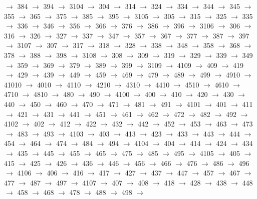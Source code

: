 $\rightarrow$ 384 $\rightarrow$ 394 $\rightarrow$ 3104 $\rightarrow$ 304 $\rightarrow$ 314 $\rightarrow$ 324 $\rightarrow$ 334 $\rightarrow$ 344 $\rightarrow$ 345 $\rightarrow$ 355 $\rightarrow$ 365 $\rightarrow$ 375 $\rightarrow$ 385 $\rightarrow$ 395 $\rightarrow$ 3105 $\rightarrow$ 305 $\rightarrow$ 315 $\rightarrow$ 325 $\rightarrow$ 335 $\rightarrow$ 336 $\rightarrow$ 346 $\rightarrow$ 356 $\rightarrow$ 366 $\rightarrow$ 376 $\rightarrow$ 386 $\rightarrow$ 396 $\rightarrow$ 3106 $\rightarrow$ 306 $\rightarrow$ 316 $\rightarrow$ 326 $\rightarrow$ 327 $\rightarrow$ 337 $\rightarrow$ 347 $\rightarrow$ 357 $\rightarrow$ 367 $\rightarrow$ 377 $\rightarrow$ 387 $\rightarrow$ 397 $\rightarrow$ 3107 $\rightarrow$ 307 $\rightarrow$ 317 $\rightarrow$ 318 $\rightarrow$ 328 $\rightarrow$ 338 $\rightarrow$ 348 $\rightarrow$ 358 $\rightarrow$ 368 $\rightarrow$ 378 $\rightarrow$ 388 $\rightarrow$ 398 $\rightarrow$ 3108 $\rightarrow$ 308 $\rightarrow$ 309 $\rightarrow$ 319 $\rightarrow$ 329 $\rightarrow$ 339 $\rightarrow$ 349 $\rightarrow$ 359 $\rightarrow$ 369 $\rightarrow$ 379 $\rightarrow$ 389 $\rightarrow$ 399 $\rightarrow$ 3109 $\rightarrow$ 4109 $\rightarrow$ 409 $\rightarrow$ 419 $\rightarrow$ 429 $\rightarrow$ 439 $\rightarrow$ 449 $\rightarrow$ 459 $\rightarrow$ 469 $\rightarrow$ 479 $\rightarrow$ 489 $\rightarrow$ 499 $\rightarrow$ 4910 $\rightarrow$ 41010 $\rightarrow$ 4010 $\rightarrow$ 4110 $\rightarrow$ 4210 $\rightarrow$ 4310 $\rightarrow$ 4410 $\rightarrow$ 4510 $\rightarrow$ 4610 $\rightarrow$ 4710 $\rightarrow$ 4810 $\rightarrow$ 480 $\rightarrow$ 490 $\rightarrow$ 4100 $\rightarrow$ 400 $\rightarrow$ 410 $\rightarrow$ 420 $\rightarrow$ 430 $\rightarrow$ 440 $\rightarrow$ 450 $\rightarrow$ 460 $\rightarrow$ 470 $\rightarrow$ 471 $\rightarrow$ 481 $\rightarrow$ 491 $\rightarrow$ 4101 $\rightarrow$ 401 $\rightarrow$ 411 $\rightarrow$ 421 $\rightarrow$ 431 $\rightarrow$ 441 $\rightarrow$ 451 $\rightarrow$ 461 $\rightarrow$ 462 $\rightarrow$ 472 $\rightarrow$ 482 $\rightarrow$ 492 $\rightarrow$ 4102 $\rightarrow$ 402 $\rightarrow$ 412 $\rightarrow$ 422 $\rightarrow$ 432 $\rightarrow$ 442 $\rightarrow$ 452 $\rightarrow$ 453 $\rightarrow$ 463 $\rightarrow$ 473 $\rightarrow$ 483 $\rightarrow$ 493 $\rightarrow$ 4103 $\rightarrow$ 403 $\rightarrow$ 413 $\rightarrow$ 423 $\rightarrow$ 433 $\rightarrow$ 443 $\rightarrow$ 444 $\rightarrow$ 454 $\rightarrow$ 464 $\rightarrow$ 474 $\rightarrow$ 484 $\rightarrow$ 494 $\rightarrow$ 4104 $\rightarrow$ 404 $\rightarrow$ 414 $\rightarrow$ 424 $\rightarrow$ 434 $\rightarrow$ 435 $\rightarrow$ 445 $\rightarrow$ 455 $\rightarrow$ 465 $\rightarrow$ 475 $\rightarrow$ 485 $\rightarrow$ 495 $\rightarrow$ 4105 $\rightarrow$ 405 $\rightarrow$ 415 $\rightarrow$ 425 $\rightarrow$ 426 $\rightarrow$ 436 $\rightarrow$ 446 $\rightarrow$ 456 $\rightarrow$ 466 $\rightarrow$ 476 $\rightarrow$ 486 $\rightarrow$ 496 $\rightarrow$ 4106 $\rightarrow$ 406 $\rightarrow$ 416 $\rightarrow$ 417 $\rightarrow$ 427 $\rightarrow$ 437 $\rightarrow$ 447 $\rightarrow$ 457 $\rightarrow$ 467 $\rightarrow$ 477 $\rightarrow$ 487 $\rightarrow$ 497 $\rightarrow$ 4107 $\rightarrow$ 407 $\rightarrow$ 408 $\rightarrow$ 418 $\rightarrow$ 428 $\rightarrow$ 438 $\rightarrow$ 448 $\rightarrow$ 458 $\rightarrow$ 468 $\rightarrow$ 478 $\rightarrow$ 488 $\rightarrow$ 498 $\rightarrow$ 